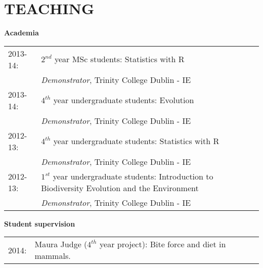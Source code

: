 \documentclass[10pt,a4paper]{article}
\begin{document}
{\begin{tabular}{ll}
\end{tabular}
\bigskip
\newpage

\section{TEACHING}
\bigskip

\raggedright\textbf{Academia}\\[1.5ex]
\begin{tabular}{ll}
2013-14: & $2^{nd}$ year MSc students: Statistics with R \\
& \textit{Demonstrator}, Trinity College Dublin - IE \\
2013-14: & $4^{th}$ year undergraduate students: Evolution\\
& \textit{Demonstrator}, Trinity College Dublin - IE\\
2012-13: & $4^{th}$ year undergraduate students: Statistics with R\\
& \textit{Demonstrator}, Trinity College Dublin - IE\\
2012-13: & $1^{st}$ year undergraduate students: Introduction to Biodiversity Evolution and the Environment\\
& \textit{Demonstrator}, Trinity College Dublin - IE\\
\end{tabular}
\raggedright\textbf{Student supervision}\\[1.5ex]
\begin{tabular}{ll}
2014: & Maura Judge ($4^{th}$ year project): Bite force and diet in mammals. \\
\end{tabular}
\bigskip

}
\end{document}

